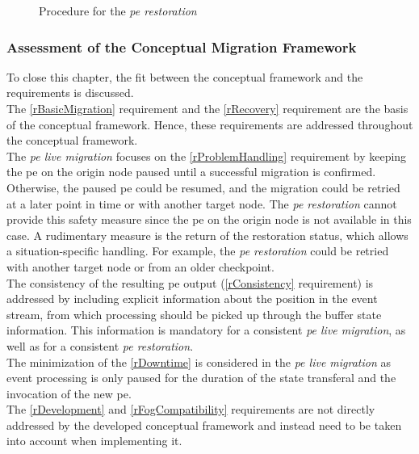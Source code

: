 \begin{figure}[!ht]
\graphicspath{{./figures/code/}}

\caption{Procedure for the \textit{\acrshort{pe} restoration}}
\label{fOSR}
\end{figure}

\subsubsection{Assessment of the Conceptual Migration Framework}
\label{lEvaluationOfMigrationConcept}
To close this chapter, the fit between the conceptual framework and the requirements is discussed.\\
The \ref{rBasicMigration} requirement and the \ref{rRecovery} requirement are the basis of the conceptual framework. Hence, these requirements are addressed throughout the conceptual framework.\\
The \textit{\acrshort{pe} live migration} focuses on the \ref{rProblemHandling} requirement by keeping the \gls{pe} on the origin node paused until a successful migration is confirmed. Otherwise, the paused \gls{pe} could be resumed, and the migration could be retried at a later point in time or with another target node. The \textit{\acrshort{pe} restoration} cannot provide this safety measure since the \gls{pe} on the origin node is not available in this case. A rudimentary measure is the return of the restoration status, which allows a situation-specific handling. For example, the \textit{\acrshort{pe} restoration} could be retried with another target node or from an older checkpoint.\\
The consistency of the resulting \gls{pe} output (\ref{rConsistency} requirement) is addressed by including explicit information about the position in the event stream, from which processing should be picked up through the buffer state information. This information is mandatory for a consistent \textit{\acrshort{pe} live migration}, as well as for a consistent \textit{\acrshort{pe} restoration}.\\
The minimization of the \ref{rDowntime} is considered in the \textit{\acrshort{pe} live migration} as event processing is only paused for the duration of the state transferal and the invocation of the new \gls{pe}.\\
The \ref{rDevelopment} and \ref{rFogCompatibility} requirements are not directly addressed by the developed conceptual framework and instead need to be taken into account when implementing it.\par